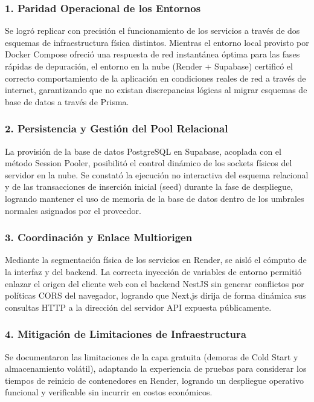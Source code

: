 \documentclass{article}
\begin{document}
\subsubsection*{1. Paridad Operacional de los Entornos}
Se logró replicar con precisión el funcionamiento de los servicios a través de dos esquemas de infraestructura física distintos. Mientras el entorno local provisto por Docker Compose ofreció una respuesta de red instantánea óptima para las fases rápidas de depuración, el entorno en la nube (Render + Supabase) certificó el correcto comportamiento de la aplicación en condiciones reales de red a través de internet, garantizando que no existan discrepancias lógicas al migrar esquemas de base de datos a través de Prisma.

\subsubsection*{2. Persistencia y Gestión del Pool Relacional}
La provisión de la base de datos PostgreSQL en Supabase, acoplada con el método Session Pooler, posibilitó el control dinámico de los sockets físicos del servidor en la nube. Se constató la ejecución no interactiva del esquema relacional y de las transacciones de inserción inicial (seed) durante la fase de despliegue, logrando mantener el uso de memoria de la base de datos dentro de los umbrales normales asignados por el proveedor.

\subsubsection*{3. Coordinación y Enlace Multiorigen}
Mediante la segmentación física de los servicios en Render, se aisló el cómputo de la interfaz y del backend. La correcta inyección de variables de entorno permitió enlazar el origen del cliente web con el backend NestJS sin generar conflictos por políticas CORS del navegador, logrando que Next.js dirija de forma dinámica sus consultas HTTP a la dirección del servidor API expuesta públicamente.

\subsubsection*{4. Mitigación de Limitaciones de Infraestructura}
Se documentaron las limitaciones de la capa gratuita (demoras de Cold Start y almacenamiento volátil), adaptando la experiencia de pruebas para considerar los tiempos de reinicio de contenedores en Render, logrando un despliegue operativo funcional y verificable sin incurrir en costos económicos.
\end{document}
